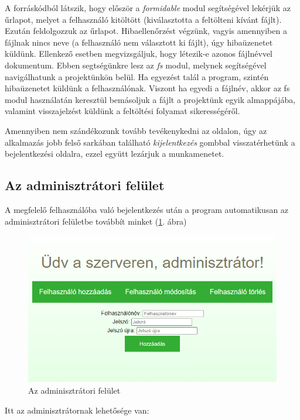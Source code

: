 A forráskódból látszik, hogy először a \textit{formidable} modul segítségével lekérjük az űrlapot, melyet a felhasználó kitöltött (kiválasztotta a feltölteni kívánt fájlt). Ezután feldolgozzuk az űrlapot. Hibaellenőrzést végzünk, vagyis amennyiben a fájlnak nincs neve (a felhasználó nem választott ki fájlt), úgy hibaüzenetet küldünk. Ellenkező esetben megvizsgáljuk, hogy létezik-e azonos fájlnévvel dokumentum. Ebben segtségünkre lesz az \textit{fs} modul, melynek segítségével navigálhatunk a projektünkön belül. Ha egyezést talál a program, szintén hibaüzenetet küldünk a felhasználónak. Viszont ha egyedi a fájlnév, akkor az fs modul használatán keresztül bemásoljuk a fájlt a projektünk egyik almappájába, valamint visszajelzést küldünk a feltöltési folyamat sikerességéről.

Amennyiben nem szándékozunk tovább tevékenykedni az oldalon, úgy az alkalmazás jobb felső sarkában található \textit{kijelentkezés} gombbal visszatérhetünk a bejelentkezési oldalra, ezzel együtt lezárjuk a munkamenetet.

\subsection{Az adminisztrátori felület}

A megfelelő felhasználóba való bejelentkezés után a program automatikusan az adminisztrátori felületbe továbbít minket (\ref{fig:admin}. ábra)

\begin{figure}[h]
	\centering
		\includegraphics[width=12truecm, height=7truecm]{images/admin_oldal.png}
	\caption{Az adminisztrátori felület}
	\label{fig:admin}
\end{figure}

Itt az adminisztrátornak lehetősége van:


